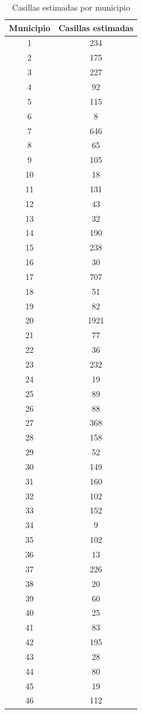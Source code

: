 \documentclass[twocolumn]{article}
\begin{document}
\begin{table}[p]
\begin{center}
    \begin{tabular}{|c|c|}
    \hline
        Municipio & Casillas estimadas \\
    \hline
     1 & 234\\
     2&175\\
     3&227\\
     4&92\\
     5&115\\
     6&8\\
     7&646\\
     8&65\\
     9&105\\
     10&18\\
     11&131\\
     12&43\\
     13&32\\
     14&190\\
     15&238\\
     16&30\\
     17&707\\
     18&51\\
     19&82\\
     20&1921\\
     21&77\\
     22&36\\
     23&232\\
     24&19\\
     25&89\\
     26&88\\
     27&368\\
     28&158\\
     29&52\\
     30&149\\
     31&160\\
     32&102\\
     33&152\\
     34&9\\
     35&102\\
     36&13\\
     37&226\\
     38&20\\
     39&60\\
     40&25\\
     41&83\\
     42&195\\
     43&28\\
     44&80\\
     45&19\\
     46&112\\
     \hline
    \end{tabular}
\end{center}
\caption{Casillas estimadas por municipio}
\label{tab:1}
\end{table}
\end{document}
